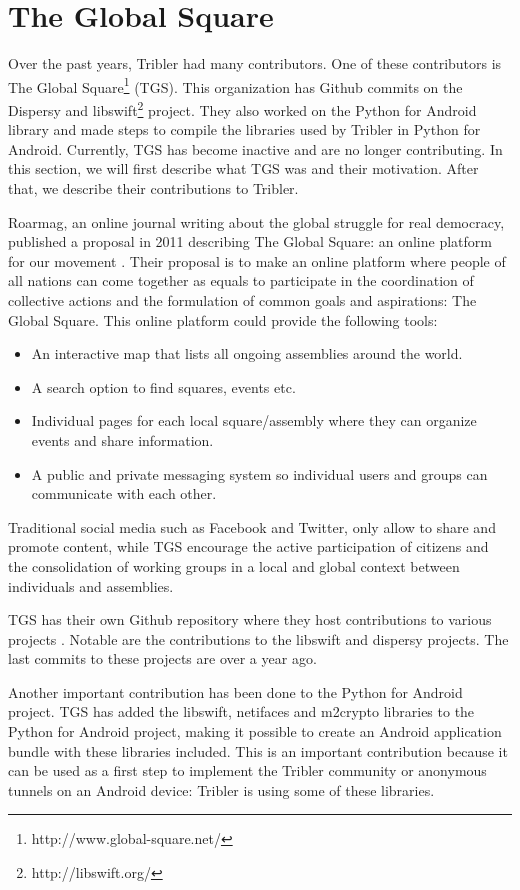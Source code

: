 \section{The Global Square}
	\label{scc:tgs}
	Over the past years, Tribler had many contributors. One of these contributors is The Global Square\footnote{http://www.global-square.net/} (TGS). This organization has Github commits on the Dispersy and libswift\footnote{http://libswift.org/} project. They also worked on the Python for Android library and made steps to compile the libraries used by Tribler in Python for Android. Currently, TGS has become inactive and are no longer contributing. In this section, we will first describe what TGS was and their motivation. After that, we describe their contributions to Tribler.

	Roarmag, an online journal writing about the global struggle for real democracy, published a proposal in 2011 describing The Global Square: an online platform for our movement \cite{theglobalsquare}. Their proposal is to make an online platform where people of all nations can come together as equals to participate in the coordination of collective actions and the formulation of common goals and aspirations: The Global Square. This online platform could provide the following tools:
	\begin{itemize}
		\item An interactive map that lists all ongoing assemblies around the world.
		\item A search option to find squares, events etc.
		\item Individual pages for each local square/assembly where they can organize events and share information.
		\item A public and private messaging system so individual users and groups can communicate with each other.
	\end{itemize}
	Traditional social media such as Facebook and Twitter, only allow to share and promote content, while TGS encourage the active participation of citizens and the consolidation of working groups in a local and global context between individuals and assemblies.
	
	TGS has their own Github repository where they host contributions to various projects \cite{theglobalsquaregithub}. Notable are the contributions to the libswift and dispersy projects. The last commits to these projects are over a year ago.
		
	Another important contribution has been done to the Python for Android project. TGS has added the libswift, netifaces and m2crypto libraries to the Python for Android project, making it possible to create an Android application bundle with these libraries included. This is an important contribution because it can be used as a first step to implement the Tribler community or anonymous tunnels on an Android device: Tribler is using some of these libraries.


